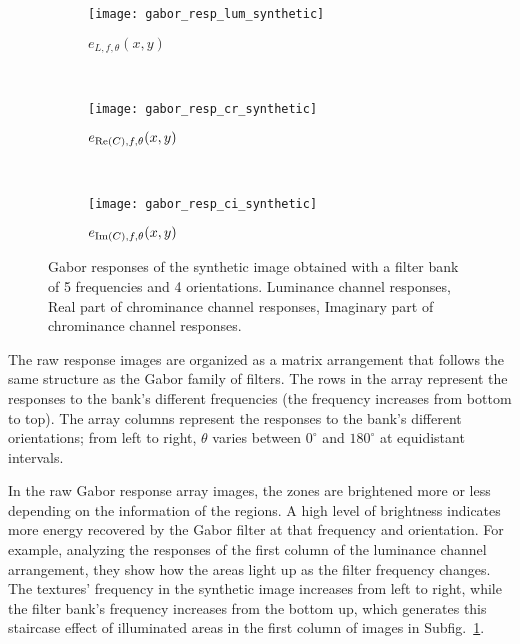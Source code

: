 \begin{figure}[!ht]
    \centering
    \begin{subfigure}[b]{\textwidth}   
        \texttt{[image: gabor\_resp\_lum\_synthetic]}
        \caption{$e_{L, f, \theta}(x,y)$} 
        \label{fig:lum_raw_gabor_energies}
    \end{subfigure} \\ [2ex]   
    \begin{subfigure}[b]{\textwidth}   
    	\texttt{[image: gabor\_resp\_cr\_synthetic]}
    	\caption{$e_{\mathrm{Re}(C), f, \theta}(x,y)$}
        \label{fig:cr_raw_gabor_energies}
    \end{subfigure} \\ [2ex]    	
    \begin{subfigure}[b]{\textwidth}  
        \texttt{[image: gabor\_resp\_ci\_synthetic]}
        \caption{$e_{\mathrm{Im}(C), f, \theta}(x,y)$}
        \label{fig:ci_raw_gabor_energies} 
    \end{subfigure} 
    	    
    \caption{Gabor responses of the synthetic image obtained with a filter bank of 5 frequencies and 4 orientations.  Luminance channel responses,  Real part of chrominance channel responses,  Imaginary part of chrominance channel responses.}\label{fig:synthetic_img_gresponses}    
\end{figure}

The raw response images are organized as a matrix arrangement that follows the same structure as the Gabor family of filters. The rows in the array represent the responses to the bank's different frequencies (the frequency increases from bottom to top). The array columns represent the responses to the bank's different orientations; from left to right, $\theta$ varies between $ 0^\circ $ and $180^\circ$ at equidistant intervals. 

In the raw Gabor response array images, the zones are brightened more or less depending on the information of the regions. A high level of brightness indicates more energy recovered by the Gabor filter at that frequency and orientation. For example, analyzing the responses of the first column of the luminance channel arrangement, they show how the areas light up as the filter frequency changes. The textures' frequency in the synthetic image increases from left to right, while the filter bank's frequency increases from the bottom up, which generates this staircase effect of illuminated areas in the first column of images in Subfig.\ \ref{fig:lum_raw_gabor_energies}.


